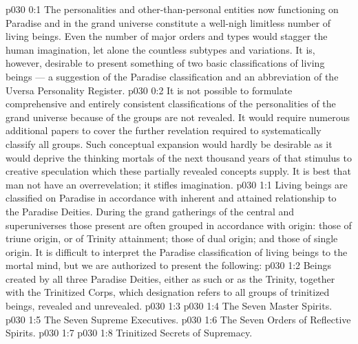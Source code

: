 \author{Mighty Messenger}
\vs p030 0:1 The personalities and other\hyp{}than\hyp{}personal entities now functioning on Paradise and in the grand universe constitute a well\hyp{}nigh limitless number of living beings. Even the number of major orders and types would stagger the human imagination, let alone the countless subtypes and variations. It is, however, desirable to present something of two basic classifications of living beings --- a suggestion of the Paradise classification and an abbreviation of the Uversa Personality Register.
\vs p030 0:2 It is not possible to formulate comprehensive and entirely consistent classifications of the personalities of the grand universe because  of the groups are not revealed. It would require numerous additional papers to cover the further revelation required to systematically classify all groups. Such conceptual expansion would hardly be desirable as it would deprive the thinking mortals of the next thousand years of that stimulus to creative speculation which these partially revealed concepts supply. It is best that man not have an overrevelation; it stifles imagination.
\vs p030 1:1 Living beings are classified on Paradise in accordance with inherent and attained relationship to the Paradise Deities. During the grand gatherings of the central and superuniverses those present are often grouped in accordance with origin: those of triune origin, or of Trinity attainment; those of dual origin; and those of single origin. It is difficult to interpret the Paradise classification of living beings to the mortal mind, but we are authorized to present the following:
\vs p030 1:2 \bibnobreakspace {} Beings created by all three Paradise Deities, either as such or as the Trinity, together with the Trinitized Corps, which designation refers to all groups of trinitized beings, revealed and unrevealed.
\vs p030 1:3 \bibnobreakspace {}
\vs p030 1:4 \bibnobreakspace The Seven Master Spirits.
\vs p030 1:5 \bibnobreakspace The Seven Supreme Executives.
\vs p030 1:6 \bibnobreakspace The Seven Orders of Reflective Spirits.
\vs p030 1:7 \bibnobreakspace {}
\vs p030 1:8 \bibnobreakspace Trinitized Secrets of Supremacy.
